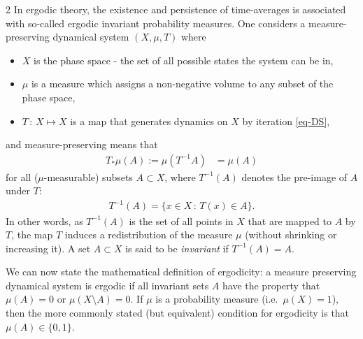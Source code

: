 \documentclass[11pt]{article}
\begin{document}
\begin{multicols}{2}
In ergodic theory, the existence and persistence of time-averages is associated with so-called ergodic invariant probability measures. One considers a measure-preserving dynamical system $(X, \mu, T)$ where
\begin{itemize}
\item $X$ is the phase space - the set of all possible states the system can be in,
\item $\mu$ is a measure which assigns a non-negative volume to any subset of the phase space,
\item $T \, :\, X \mapsto X$ is a map that generates dynamics on $X$ by iteration \eqref{eq-DS},
\end{itemize}
and measure-preserving means that
\begin{align}
  \label{eq-measure-preserving}
T_*\mu(A):=\mu(T^{-1} A) & = \mu(A)
\end{align}
for all ($\mu$-measurable) subsets $A \subset X$, 
where $T^{-1}(A)$ denotes the pre-image of $A$ under $T$:
\begin{align}
  T^{-1}(A) = \{ x \in X \, : \, T(x) \in A \}.
\end{align}
In other words, as $T^{-1}(A)$ is the set of all points in $X$ that are mapped to $A$ by $T$, the map $T$ induces a redistribution of the measure $\mu$ (without shrinking or increasing it). A set $A\subset X$ is said to be {\em invariant} if $T^{-1}(A) = A$.

We can now state the mathematical definition of ergodicity: a measure preserving dynamical system is ergodic if all invariant sets $A$ have the property that $\mu(A)=0$ or $\mu(X\setminus A)=0$. If $\mu$ is a probability measure (i.e.\ $\mu(X)=1$), then the more commonly stated (but equivalent) condition for ergodicity is that $\mu(A)\in\{0,1\}$.


\end{multicols}
\end{document}

